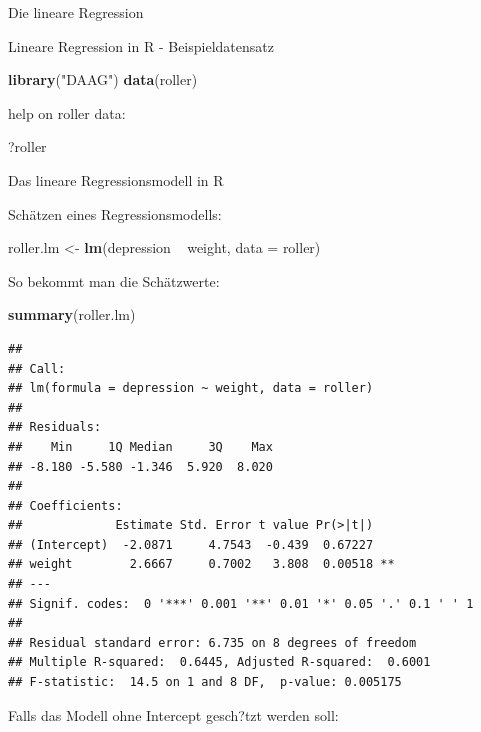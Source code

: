 \documentclass[ignorenonframetext,]{beamer}
\newenvironment{Shaded}{}{}
\newcommand{\KeywordTok}[1]{\textcolor[rgb]{0.00,0.44,0.13}{\textbf{{#1}}}}
\newcommand{\DataTypeTok}[1]{\textcolor[rgb]{0.56,0.13,0.00}{{#1}}}
\newcommand{\StringTok}[1]{\textcolor[rgb]{0.25,0.44,0.63}{{#1}}}
\newcommand{\NormalTok}[1]{{#1}}
\begin{document}
\begin{frame}[fragile]{Die lineare Regression}
\begin{block}{Lineare Regression in R - Beispieldatensatz}
\begin{Shaded}
\begin{Highlighting}[]
\KeywordTok{library}\NormalTok{(}\StringTok{"DAAG"}\NormalTok{)}
\KeywordTok{data}\NormalTok{(roller)}
\end{Highlighting}
\end{Shaded}

help on roller data:

\begin{Shaded}
\begin{Highlighting}[]
\NormalTok{?roller}
\end{Highlighting}
\end{Shaded}

\end{block}

\begin{block}{Das lineare Regressionsmodell in R}

Schätzen eines Regressionsmodells:

\begin{Shaded}
\begin{Highlighting}[]
\NormalTok{roller.lm <-}\StringTok{ }\KeywordTok{lm}\NormalTok{(depression ~}\StringTok{ }\NormalTok{weight, }\DataTypeTok{data =} \NormalTok{roller)}
\end{Highlighting}
\end{Shaded}

So bekommt man die Schätzwerte:

\begin{Shaded}
\begin{Highlighting}[]
\KeywordTok{summary}\NormalTok{(roller.lm)}
\end{Highlighting}
\end{Shaded}

\begin{verbatim}
## 
## Call:
## lm(formula = depression ~ weight, data = roller)
## 
## Residuals:
##    Min     1Q Median     3Q    Max 
## -8.180 -5.580 -1.346  5.920  8.020 
## 
## Coefficients:
##             Estimate Std. Error t value Pr(>|t|)   
## (Intercept)  -2.0871     4.7543  -0.439  0.67227   
## weight        2.6667     0.7002   3.808  0.00518 **
## ---
## Signif. codes:  0 '***' 0.001 '**' 0.01 '*' 0.05 '.' 0.1 ' ' 1
## 
## Residual standard error: 6.735 on 8 degrees of freedom
## Multiple R-squared:  0.6445, Adjusted R-squared:  0.6001 
## F-statistic:  14.5 on 1 and 8 DF,  p-value: 0.005175
\end{verbatim}

Falls das Modell ohne Intercept gesch?tzt werden soll:


\end{block}
\end{frame}
\end{document}
